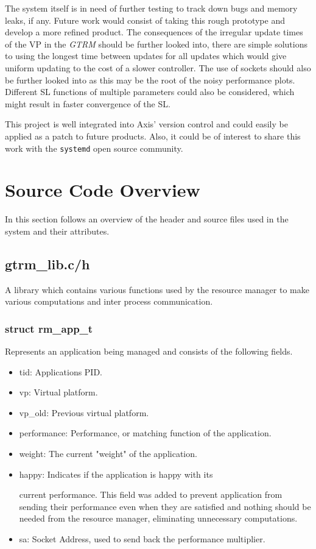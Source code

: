 \documentclass[nobiblatex]{LTHthesis}
\begin{document}
The system itself is in need of further testing to track down bugs and
memory leaks, if any. Future work would consist of taking this rough
prototype and develop a more refined product. The consequences of the irregular update times of the VP
in the \emph{GTRM} should be further looked into, there are simple solutions to using the longest time 
between updates for all updates which would give uniform updating to the cost of a slower controller.
The use of sockets should also be further looked into as this may be the root of the noisy performance plots.
Different SL functions of multiple parameters could also be considered, which might result in faster convergence 
of the SL. 


This project is well 
integrated into Axis' version control and could easily be applied as a 
patch to future products. Also, it could be of interest to share this 
work with the \texttt{systemd} open source community.





\appendix

\chapter{Source Code Overview}

In this section follows an overview of the header and source files used in the system and their attributes.

\section{gtrm\_lib.c/h}
A library which contains various functions used by the resource manager to make various computations and inter process communication.

\subsection{struct rm\_app\_t}
Represents an application being managed and consists of the following fields.
\begin{itemize}
\item tid: Applications PID.
\item vp: Virtual platform.
\item vp\_old: Previous virtual platform.
\item performance: Performance, or matching function of the application.
\item weight: The current "weight" of the application.
\item happy: Indicates if the application is happy with its 

	  current performance. This field was added to prevent application from sending their performance even when they are satisfied and nothing should be needed from the resource manager, eliminating unnecessary computations.
\item sa: Socket Address, used to send back the performance multiplier.
\end{itemize}
\end{document}
